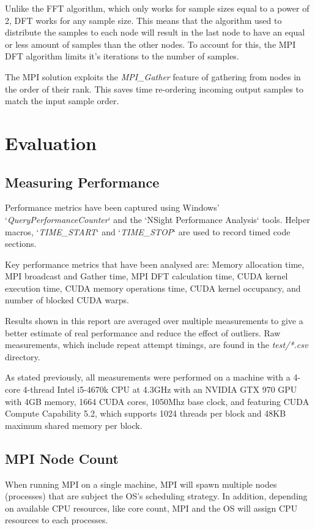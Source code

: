 \documentclass[11pt,a4paper]{article}
\begin{document}
Unlike the FFT algorithm, which only works for sample sizes equal to a power of 2, DFT works for any sample size. This means that the algorithm used to distribute the samples to each node will result in the last node to have an equal or less amount of samples than the other nodes. To account for this, the MPI DFT algorithm limits it's iterations to the number of samples. 

The MPI solution exploits the \textit{MPI\_Gather} feature of gathering from nodes in the order of their rank. This saves time re-ordering incoming output samples to match the input sample order.


\section{Evaluation}
\subsection{Measuring Performance}
Performance metrics have been captured using Windows' `\textit{QueryPerformanceCounter}` and the `NSight Performance Analysis` tools. Helper macros, `\textit{TIME\_START}` and `\textit{TIME\_STOP}` are used to record timed code sections.

Key performance metrics that have been analysed are: Memory allocation time, MPI broadcast and Gather time, MPI DFT calculation time, CUDA kernel execution time, CUDA memory operations time, CUDA kernel occupancy, and number of blocked CUDA warps.

Results shown in this report are averaged over multiple measurements to give a better estimate of real performance and reduce the effect of outliers. Raw measurements, which include repeat attempt timings, are found in the \textit{test/*.csv} directory.

As stated previously, all measurements were performed on a machine with a 4-core 4-thread Intel i5-4670k CPU at 4.3GHz with an NVIDIA GTX 970 GPU with 4GB memory, 1664 CUDA cores, 1050Mhz base clock, and featuring CUDA Compute Capability 5.2, which supports 1024 threads per block and 48KB maximum shared memory per block.

\subsection{MPI Node Count}\label{sect:MPI Node Count}
When running MPI on a single machine, MPI will spawn multiple nodes (processes) that are subject the OS's scheduling strategy. In addition, depending on available CPU resources, like core count, MPI and the OS will assign CPU resources to each processes.
\end{document}
